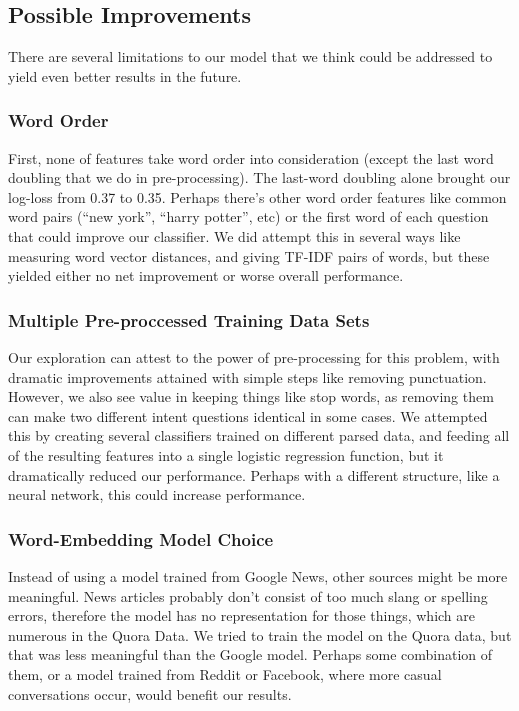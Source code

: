 \documentclass{article}
\begin{document}
\subsection{Possible Improvements}
There are several limitations to our model that we think could be addressed to yield even better results in the future.

\subsubsection{Word Order} First, none of features take word order into
consideration (except the last word doubling that we do in pre-processing). The
last-word doubling alone brought our log-loss from 0.37 to 0.35. Perhaps there’s
other word order features like common word pairs (“new york”, “harry potter”,
etc) or the first word of each question that could improve our classifier. We
did attempt this in several ways like measuring word vector distances, and
giving TF-IDF pairs of words, but these yielded either no net improvement or
worse overall performance.

\subsubsection{Multiple Pre-proccessed Training Data Sets}

Our exploration can attest to the power of pre-processing for this problem, with
dramatic improvements attained with simple steps like removing punctuation.
However, we also see value in keeping things like stop words, as removing them
can make two different intent questions identical in some cases. We attempted
this by creating several classifiers trained on different parsed data, and
feeding all of the resulting features into a single logistic regression
function, but it dramatically reduced our performance. Perhaps with a different
structure, like a neural network, this could increase performance.

\subsubsection{Word-Embedding Model Choice}

Instead of using a model trained from Google News, other sources might be more
meaningful. News articles probably don’t consist of too much slang or spelling
errors, therefore the model has no representation for those things, which are
numerous in the Quora Data. We tried to train the model on the Quora data, but
that was less meaningful than the Google model. Perhaps some combination of
them, or a model trained from Reddit or Facebook, where more casual
conversations occur, would benefit our results.
\end{document}
